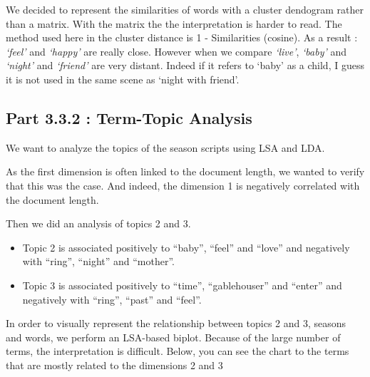 \documentclass[
]{article}
\providecommand{\tightlist}{%
  \setlength{\itemsep}{0pt}\setlength{\parskip}{0pt}}
\begin{document}
We decided to represent the similarities of words with a cluster
dendogram rather than a matrix. With the matrix the the interpretation
is harder to read. The method used here in the cluster distance is 1 -
Similarities (cosine). As a result : \emph{`feel'} and \emph{`happy'}
are really close. However when we compare \emph{`live'}, \emph{`baby'}
and \emph{`night'} and \emph{`friend'} are very distant. Indeed if it
refers to `baby' as a child, I guess it is not used in the same scene as
`night with friend'.

\hypertarget{part-3.3.2-term-topic-analysis}{%
\subsection{Part 3.3.2 : Term-Topic
Analysis}\label{part-3.3.2-term-topic-analysis}}

We want to analyze the topics of the season scripts using LSA and LDA.

As the first dimension is often linked to the document length, we wanted
to verify that this was the case. And indeed, the dimension 1 is
negatively correlated with the document length.

Then we did an analysis of topics 2 and 3.

\begin{itemize}
\tightlist
\item
  Topic 2 is associated positively to ``baby'', ``feel'' and ``love''
  and negatively with ``ring'', ``night'' and ``mother''.
\item
  Topic 3 is associated positively to ``time'', ``gablehouser'' and
  ``enter'' and negatively with ``ring'', ``past'' and ``feel''.
\end{itemize}

In order to visually represent the relationship between topics 2 and 3,
seasons and words, we perform an LSA-based biplot. Because of the large
number of terms, the interpretation is difficult. Below, you can see the
chart to the terms that are mostly related to the dimensions 2 and 3
\end{document}
